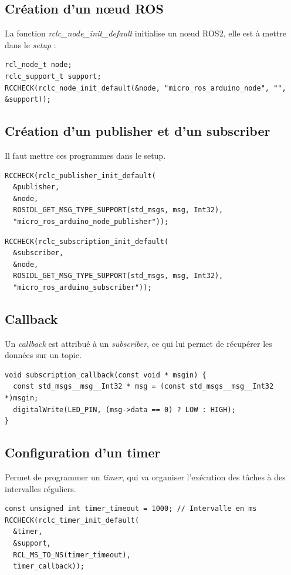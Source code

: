 \subsection{Création d'un nœud ROS}
\noindent La fonction \textit{rclc\_node\_init\_default} initialise un nœud ROS2, elle est à mettre dans le \textit{setup} :

\begin{lstlisting}[style=commandstyle]
rcl_node_t node;
rclc_support_t support;
RCCHECK(rclc_node_init_default(&node, "micro_ros_arduino_node", "", &support));
\end{lstlisting}

\subsection{Création d'un publisher et d'un subscriber}

\noindent Il faut mettre ces programmes dans le setup.
\begin{lstlisting}[style=commandstyle , caption={Création d'un Publisher}]
RCCHECK(rclc_publisher_init_default(
  &publisher,
  &node,
  ROSIDL_GET_MSG_TYPE_SUPPORT(std_msgs, msg, Int32),
  "micro_ros_arduino_node_publisher"));
\end{lstlisting}

\begin{lstlisting}[style=commandstyle ,caption={Création d'un Subscriber}]
RCCHECK(rclc_subscription_init_default(
  &subscriber,
  &node,
  ROSIDL_GET_MSG_TYPE_SUPPORT(std_msgs, msg, Int32),
  "micro_ros_arduino_subscriber"));
\end{lstlisting}
\vspace{-0.3cm}
\subsection{Callback}

\noindent Un \textit{callback} est attribué à un \textit{subscriber}, ce qui lui permet de récupérer les données sur un topic.

\begin{lstlisting}[style=commandstyle]
void subscription_callback(const void * msgin) {
  const std_msgs__msg__Int32 * msg = (const std_msgs__msg__Int32 *)msgin;
  digitalWrite(LED_PIN, (msg->data == 0) ? LOW : HIGH);
}
\end{lstlisting}

\subsection{Configuration d'un timer}
\noindent Permet de programmer un \textit{timer}, qui va organiser l’exécution des tâches à des intervalles réguliers.
\begin{lstlisting}[style=commandstyle]
const unsigned int timer_timeout = 1000; // Intervalle en ms
RCCHECK(rclc_timer_init_default(
  &timer,
  &support,
  RCL_MS_TO_NS(timer_timeout),
  timer_callback));
\end{lstlisting}

